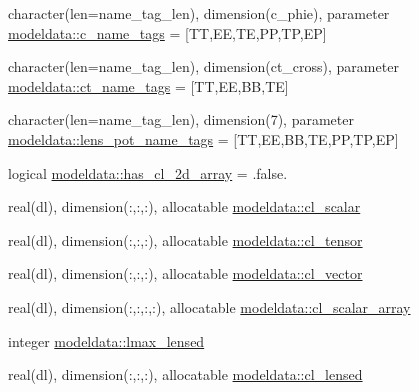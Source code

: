 \begin{DoxyCompactItemize}
\item 
character(len=name\+\_\+tag\+\_\+len), dimension(c\+\_\+phie), parameter \mbox{\hyperlink{namespacemodeldata_a5d4df179847dfc001c062789b178f4d1}{modeldata\+::c\+\_\+name\+\_\+tags}} = \mbox{[}\textquotesingle{}TT\textquotesingle{},\textquotesingle{}EE\textquotesingle{},\textquotesingle{}TE\textquotesingle{},\textquotesingle{}PP\textquotesingle{},\textquotesingle{}TP\textquotesingle{},\textquotesingle{}EP\textquotesingle{}\mbox{]}
\item 
character(len=name\+\_\+tag\+\_\+len), dimension(ct\+\_\+cross), parameter \mbox{\hyperlink{namespacemodeldata_add55f08ccdcc65479fca4cd2858b420d}{modeldata\+::ct\+\_\+name\+\_\+tags}} = \mbox{[}\textquotesingle{}TT\textquotesingle{},\textquotesingle{}EE\textquotesingle{},\textquotesingle{}BB\textquotesingle{},\textquotesingle{}TE\textquotesingle{}\mbox{]}
\item 
character(len=name\+\_\+tag\+\_\+len), dimension(7), parameter \mbox{\hyperlink{namespacemodeldata_ac4a0361c6d9a7692c9cbf7a08dc43e49}{modeldata\+::lens\+\_\+pot\+\_\+name\+\_\+tags}} = \mbox{[}\textquotesingle{}TT\textquotesingle{},\textquotesingle{}EE\textquotesingle{},\textquotesingle{}BB\textquotesingle{},\textquotesingle{}TE\textquotesingle{},\textquotesingle{}PP\textquotesingle{},\textquotesingle{}TP\textquotesingle{},\textquotesingle{}EP\textquotesingle{}\mbox{]}
\item 
logical \mbox{\hyperlink{namespacemodeldata_a446d6a37d3ee5445c94a5f0d5470021a}{modeldata\+::has\+\_\+cl\+\_\+2d\+\_\+array}} = .false.
\item 
real(dl), dimension(\+:,\+:,\+:), allocatable \mbox{\hyperlink{namespacemodeldata_a1d7527074ae8035793a2d9cf5cb4a8e8}{modeldata\+::cl\+\_\+scalar}}
\item 
real(dl), dimension(\+:,\+:,\+:), allocatable \mbox{\hyperlink{namespacemodeldata_a3108cab8cb9fec5823d887825efd266d}{modeldata\+::cl\+\_\+tensor}}
\item 
real(dl), dimension(\+:,\+:,\+:), allocatable \mbox{\hyperlink{namespacemodeldata_ab8016bbfb187a558b12d8a9c17f6b85c}{modeldata\+::cl\+\_\+vector}}
\item 
real(dl), dimension(\+:,\+:,\+:,\+:), allocatable \mbox{\hyperlink{namespacemodeldata_a24816a1c9914f5b5567b61ed37aa320b}{modeldata\+::cl\+\_\+scalar\+\_\+array}}
\item 
integer \mbox{\hyperlink{namespacemodeldata_a538b61c12ebffc4e237d03392898a395}{modeldata\+::lmax\+\_\+lensed}}
\item 
real(dl), dimension(\+:,\+:,\+:), allocatable \mbox{\hyperlink{namespacemodeldata_aa6168a25119bd0a5064f367267954562}{modeldata\+::cl\+\_\+lensed}}

\end{DoxyCompactItemize}
